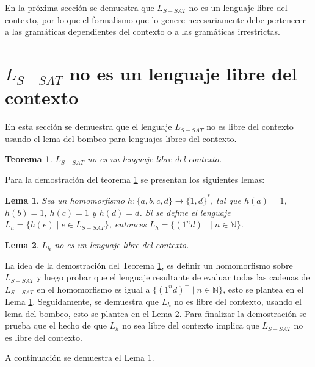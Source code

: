 \documentclass[12pt]{article}
\newtheorem{theorem}{Teorema}
\newtheorem{lemma}{Lema}
\begin{document}
En la próxima sección se demuestra que $L_{S-SAT}$ no es un lenguaje libre del contexto, por lo que el formalismo que lo genere necesariamente debe pertenecer a las gramáticas dependientes del contexto o a las gramáticas irrestrictas.

\section{$L_{S-SAT}$ no es un lenguaje libre del contexto}
\label{sec:LSATCFL}

En esta sección se demuestra que el lenguaje $L_{S-SAT}$ no es libre del contexto usando el lema del bombeo para lenguajes libres del contexto.

\begin{theorem}
    \label{teo:LSATCFL}
    $L_{S-SAT}$ no es un lenguaje libre del contexto.
\end{theorem}

Para la demostración del teorema \ref{teo:LSATCFL} se presentan los siguientes lemas:

\begin{lemma}
    \label{lem:Lh}
    Sea un homomorfismo $h: \{a,b,c,d\}\to \{1,d\}^*$, tal 
    que $h(a)=1$, $h(b)=1$, $h(c)=1$ y $h(d)=d$. Si se define el lenguaje $L_h=\{h(e)\mid e\in L_{S-SAT}\}$,
    entonces $L_h=\{(1^nd)^+\mid n\in \mathbb{N}\}$.
\end{lemma}

\begin{lemma}
    \label{lem:LhCFL}
    $L_h$ no es un lenguaje libre del contexto.
\end{lemma}

La idea de la demostración del Teorema \ref{teo:LSATCFL}, es definir un homomorfismo sobre $L_{S-SAT}$ y luego probar que el lenguaje resultante de evaluar todas las cadenas de $L_{S-SAT}$ en el homomorfismo es igual a $\{(1^nd)^+\mid n\in \mathbb{N}\}$, esto se plantea en el Lema \ref{lem:Lh}. Seguidamente, se demuestra que $L_h$ no es libre del contexto, usando el lema del bombeo, esto se plantea en el Lema \ref{lem:LhCFL}. Para finalizar la demostración se prueba que el hecho de que $L_h$ no sea libre del contexto implica que $L_{S-SAT}$ no es libre del contexto.

A continuación se demuestra el Lema \ref{lem:Lh}.
\end{document}
